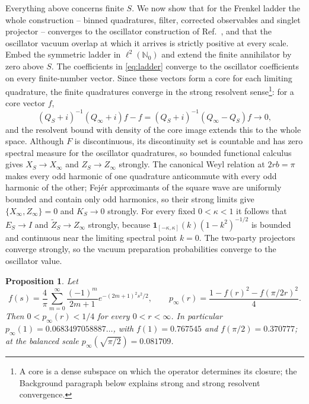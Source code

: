 \documentclass[11pt,a4paper]{article}
\newtheorem{proposition}{Proposition}
\newcommand{\Zt}{\widetilde Z}
\begin{document}
Everything above concerns finite $S$. We now show that for the Frenkel ladder the whole construction -- binned quadratures, filter, corrected observables and singlet projector -- converges to the oscillator construction of Ref.~\cite{Sorella2026}, and that the oscillator vacuum overlap at which it arrives is strictly positive at every scale. Embed the symmetric ladder in $\ell^2(\mathbb N_0)$ and extend the finite annihilator by zero above $S$. The coefficients in \eqref{eq:ladder} converge to the oscillator coefficients on every finite-number vector. Since these vectors form a core for each limiting quadrature, the finite quadratures converge in the strong resolvent sense\footnote{A core is a dense subspace on which the operator determines its closure; the Background paragraph below explains strong and strong resolvent convergence.}: for a core vector $f$,
\begin{equation}
(Q_S+i)^{-1}(Q_\infty+i)f-f=(Q_S+i)^{-1}(Q_\infty-Q_S)f\longrightarrow0,
\end{equation}
and the resolvent bound with density of the core image extends this to the whole space. Although $F$ is discontinuous, its discontinuity set is countable and has zero spectral measure for the oscillator quadratures, so bounded functional calculus gives $X_S\to X_\infty$ and $Z_S\to Z_\infty$ strongly. The canonical Weyl relation at $2rb=\pi$ makes every odd harmonic of one quadrature anticommute with every odd harmonic of the other; Fej\'er approximants of the square wave are uniformly bounded and contain only odd harmonics, so their strong limits give $\{X_\infty,Z_\infty\}=0$ and $K_S\to0$ strongly. For every fixed $0<\kappa<1$ it follows that $E_S\to I$ and $\Zt_S\to Z_\infty$ strongly, because $\mathbf 1_{[-\kappa,\kappa]}(k)(1-k^2)^{-1/2}$ is bounded and continuous near the limiting spectral point $k=0$. The two-party projectors converge strongly, so the vacuum preparation probabilities converge to the oscillator value.

\begin{proposition}
\label{prop:positive}
Let
\begin{equation}
f(s)=\frac4\pi\sum_{m=0}^\infty\frac{(-1)^m}{2m+1}e^{-(2m+1)^2s^2/2},\qquad
p_\infty(r)=\frac{1-f(r)^2-f(\pi/2r)^2}{4}.
\label{eq:f}
\end{equation}
Then $0<p_\infty(r)<1/4$ for every $0<r<\infty$. In particular $p_\infty(1)=0.0683497058887\ldots$, with $f(1)=0.767545$ and $f(\pi/2)=0.370777$; at the balanced scale $p_\infty(\sqrt{\pi/2})=0.081709$.
\end{proposition}
\end{document}
